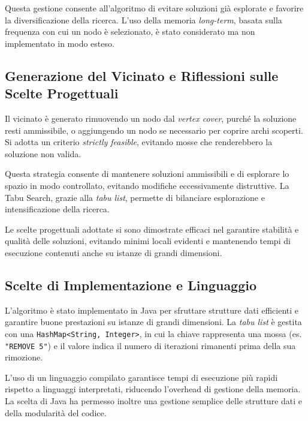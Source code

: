 Questa gestione consente all'algoritmo di evitare soluzioni già esplorate e favorire la diversificazione della ricerca. L'uso della memoria \textit{long-term}, basata sulla frequenza con cui un nodo è selezionato, è stato considerato ma non implementato in modo esteso.

\subsection{Generazione del Vicinato e Riflessioni sulle Scelte Progettuali}

Il vicinato è generato rimuovendo un nodo dal \textit{vertex cover}, purché la soluzione resti ammissibile, o aggiungendo un nodo se necessario per coprire archi scoperti. Si adotta un criterio \textit{strictly feasible}, evitando mosse che renderebbero la soluzione non valida. 

Questa strategia consente di mantenere soluzioni ammissibili e di esplorare lo spazio in modo controllato, evitando modifiche eccessivamente distruttive. La Tabu Search, grazie alla \textit{tabu list}, permette di bilanciare esplorazione e intensificazione della ricerca. 

Le scelte progettuali adottate si sono dimostrate efficaci nel garantire stabilità e qualità delle soluzioni, evitando minimi locali evidenti e mantenendo tempi di esecuzione contenuti anche su istanze di grandi dimensioni.

\subsection{Scelte di Implementazione e Linguaggio}

L'algoritmo è stato implementato in Java per sfruttare strutture dati efficienti e garantire buone prestazioni su istanze di grandi dimensioni. La \textit{tabu list} è gestita con una \texttt{HashMap<String, Integer>}, in cui la chiave rappresenta una mossa (es. \texttt{"REMOVE 5"}) e il valore indica il numero di iterazioni rimanenti prima della sua rimozione.

L'uso di un linguaggio compilato garantisce tempi di esecuzione più rapidi rispetto a linguaggi interpretati, riducendo l'overhead di gestione della memoria. La scelta di Java ha permesso inoltre una gestione semplice delle strutture dati e della modularità del codice.

